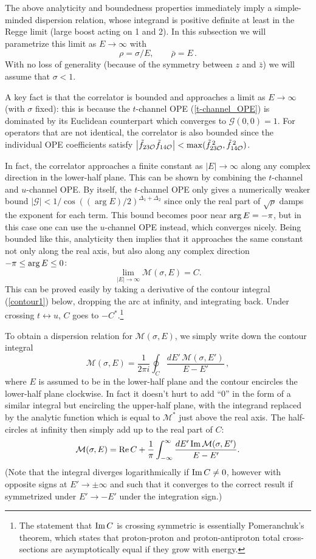 \documentclass[11pt, reqno,preprint]{article}
\def\be{\begin{equation}}
\def\ee{\end{equation}}
\def\OO{\mathcal{O}}
\def\rhobar{\bar{\rho}}
\def\zbar{\bar{z}}
\def\GG{\mathcal{G}}
\begin{document}
The above analyticity and boundedness properties immediately imply
a simple-minded dispersion relation, whose integrand is positive definite at least in
the Regge limit (large boost acting on 1 and 2).
In this subsection we will parametrize this limit as $E\to\infty$ with
\be
 \rho= \sigma/E, \qquad \rhobar= E \,.
\ee
With no loss of generality (because of the symmetry between $z$ and $\zbar$) we will assume that $\sigma<1$.

A key fact is that the correlator is bounded and approaches a limit as $E\to\infty$ (with $\sigma$ fixed):
this is because the $t$-channel OPE (\ref{t-channel_OPE}) is dominated by its Euclidean counterpart which converges to $\GG(0,0)=1$.
For operators that are not identical, the correlator is also bounded since the individual OPE coefficients satisfy
$\big|\tilde{f}_{23\OO}\tilde{f}_{14\OO}\big|< {\rm max}(\tilde{f}_{23\OO}^{\,2},\tilde{f}_{14\OO}^{\,2})$.

In fact, the correlator approaches a finite constant as $|E|\to\infty$ along any complex direction in the lower-half plane.
This can be shown by combining the $t$-channel and $u$-channel OPE.
By itself, the $t$-channel OPE only gives a numerically
weaker bound $|\GG|<1/\cos((\arg E)/2)^{\Delta_1+\Delta_2}$
since only the real part of $\sqrt{\rho}$ damps the exponent for each term.
This bound becomes poor near ${\rm arg}\,E=-\pi$, but in this case one can use the $u$-channel OPE instead, which converges nicely.
Being bounded like this, analyticity then implies that it approaches the same constant not only along the real axis,
but also along any complex direction $-\pi\leq{\rm arg}\,E\leq 0$:
\be
 \lim_{|E|\to\infty}\mathcal{M}(\sigma,E) = C.
\ee
This can be proved easily by taking a derivative of the contour integral (\ref{contour1}) below, dropping the arc at infinity,
and integrating back.
Under crossing $t\leftrightarrow u$, $C$ goes to $-C^*$.\footnote{
The statement that ${\rm Im}\,C$ is crossing symmetric is essentially Pomeranchuk's theorem,
which states that proton-proton and proton-antiproton total cross-sections are asymptotically equal if they grow with energy.}

To obtain a dispersion relation for $\mathcal{M}(\sigma,E)$, we simply write down the contour integral
\be
 \mathcal{M}(\sigma,E) = \frac{1}{2\pi i}\oint_{C} \frac{dE'\,\mathcal{M}(\sigma,E')}{E-E'}\,, \label{contour1}
\ee
where $E$ is assumed to be in the lower-half plane and the contour encircles the lower-half plane clockwise.
In fact it doesn't hurt to add ``0'' in the form of a similar integral but encircling the upper-half plane,
with the integrand replaced by the  analytic function which is equal to $\mathcal{M}^*$ just above the real axis.
The half-circles at infinity then simply add up to the real part of $C$:
\be
 \mathcal{M}(\sigma,E) = {\rm Re}\,C + \frac{1}{\pi} \int_{-\infty}^\infty \frac{dE'\,{\rm Im}\,\mathcal{M}(\sigma,E')}{E-E'}. \label{toy_dispersion}
\ee
(Note that the integral diverges logarithmically if ${\rm Im}\,C\neq 0$, however with opposite signs at $E'\to \pm\infty$
and such that it converges to the correct result if symmetrized under $E'\to -E'$ under the integration sign.)
\end{document}
